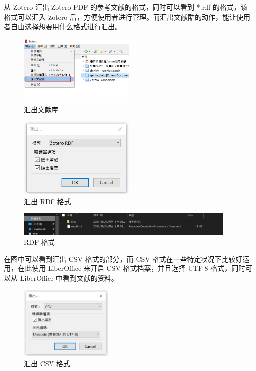从 Zotero 汇出 Zotero PDF 的参考文献的格式，同时可以看到 *.rdf 的格式，该格式可以汇入 Zotero 后，方便使用者进行管理。而汇出文献酷的动作，能让使用者自由选择想要用什么格式进行汇出。

\begin{figure}[htb]
\centering 
\includegraphics[width=0.50\textwidth]{img/c2m3.png} 
\caption{汇出文献库}
\label{Test}
\end{figure}

\begin{figure}[htb]
\centering 
\includegraphics[width=0.50\textwidth]{img/c2m4.png} 
\caption{汇出 RDF 格式}
\label{Test}
\end{figure}

\begin{figure}[htb]
\centering 
\includegraphics[width=0.95\textwidth]{img/c2m5.png} 
\caption{RDF 格式}
\label{Test}
\end{figure}

在图中可以看到汇出 CSV 格式的部分，而 CSV 格式在一些特定状况下比较好运用，在此使用 LiberOffice 来开启 CSV 格式档案，并且选择 UTF-8 格式，同时可以从 LiberOffice 中看到文献的资料。

\begin{figure}[htb]
\centering 
\includegraphics[width=0.40\textwidth]{img/c2m6.png} 
\caption{汇出 CSV 格式}
\label{Test}
\end{figure}

